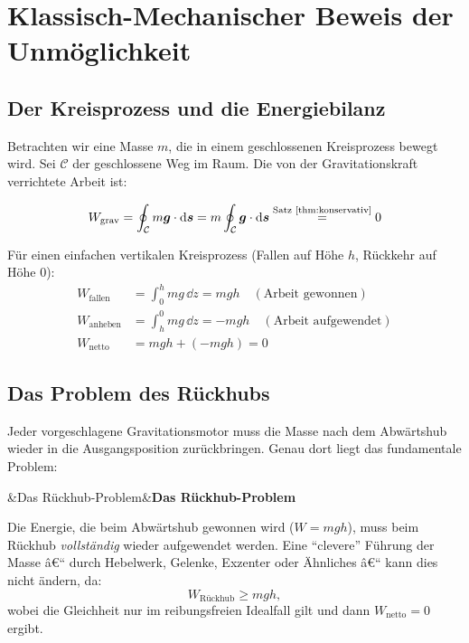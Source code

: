﻿\documentclass[12pt, a4paper]{report}
\newenvironment{wichtig}[1][]{%
  \begin{wichtigframe}\sloppy%
  \ifx&#1&\else\textbf{#1}\par\smallskip\fi}{\end{wichtigframe}}
\theoremstyle{definition}
\theoremstyle{remark}
\newcommand{\vek}[1]{\boldsymbol{#1}}
\begin{document}
\chapter{Klassisch-Mechanischer Beweis der Unmöglichkeit}
\label{sec:klassisch}

\section{Der Kreisprozess und die Energiebilanz}

Betrachten wir eine Masse $m$, die in einem geschlossenen Kreisprozess bewegt wird.
Sei $\mathcal{C}$ der geschlossene Weg im Raum. Die von der Gravitationskraft
verrichtete Arbeit ist:

\begin{equation}
  W_{\text{grav}} = \oint_{\mathcal{C}} m\vek{g} \cdot \dd\vek{s}
  = m \oint_{\mathcal{C}} \vek{g} \cdot \dd\vek{s}
  \stackrel{\text{Satz \ref{thm:konservativ}}}{=} 0
\end{equation}

Für einen einfachen vertikalen Kreisprozess (Fallen auf Höhe $h$, Rückkehr auf
Höhe $0$):
\begin{align}
  W_{\text{fallen}} &= \int_0^h m g \, \dd z = mgh \quad (\text{Arbeit gewonnen}) \\
  W_{\text{anheben}} &= \int_h^0 mg \, \dd z = -mgh \quad (\text{Arbeit aufgewendet}) \\
  W_{\text{netto}} &= mgh + (-mgh) = 0
\end{align}

\section{Das Problem des Rückhubs}

Jeder vorgeschlagene Gravitationsmotor muss die Masse nach dem Abwärtshub wieder
in die Ausgangsposition zurückbringen. Genau dort liegt das fundamentale Problem:

\begin{wichtig}[Das Rückhub-Problem]
  Die Energie, die beim Abwärtshub gewonnen wird ($W = mgh$), muss beim
  Rückhub \emph{vollständig} wieder aufgewendet werden. Eine ``clevere''
  Führung der Masse â€“ durch Hebelwerk, Gelenke, Exzenter oder Ähnliches â€“
  kann dies nicht ändern, da:
  \begin{equation}
    W_{\text{Rückhub}} \geq mgh,
  \end{equation}
  wobei die Gleichheit nur im reibungsfreien Idealfall gilt und dann
  $W_{\text{netto}} = 0$ ergibt.
\end{wichtig}
\end{document}
